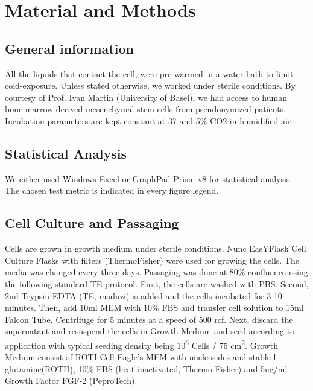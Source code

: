 \newcommand{\product}{\textit}

\chapter{Material and Methods}

\section{General information}
All the liquids that contact the cell, were pre-warmed in a water-bath to limit cold-exposure. Unless stated otherwise, we worked under sterile conditions. By courtesy of Prof. Ivan Martin (University of Basel), we had access to human bone-marrow derived mesenchymal stem cells from pseudonymized patients. Incubation parameters are kept constant at 37 \degC{} and 5\% CO2 in humidified air.

\section{Statistical Analysis}
We either used Windows Excel or GraphPad Prism v8 for statistical analysis. The chosen test metric is indicated in every figure legend.

\section{Cell Culture and Passaging}
Cells are grown in growth medium under sterile conditions. Nunc\texttrademark{} EasYFlask\texttrademark{} Cell Culture Flasks with filters (ThermoFisher) were used for growing the cells. The media was changed every three days. Passaging was done at 80\% confluence using the following standard TE-protocol. First, the cells are washed with PBS. Second, 2ml Trypsin-EDTA (TE, maduzi) is added and the cells incubated for 3-10 minutes. Then, add 10ml MEM\textalpha{} with 10\% FBS and transfer cell solution to 15ml Falcon Tube. Centrifuge for 5 minutes at a speed of 500 rcf. Next, discard the supernatant and resuspend the cells in Growth Medium and seed according to application with typical seeding density being 10\textsuperscript{6} Cells / 75 cm\textsuperscript{2}. 
Growth Medium consist of ROTI\textregistered{} Cell Eagle's MEM\textalpha{} with nucleosides and stable l-glutamine(ROTH), 10\% FBS (heat-inactivated, Thermo Fisher) and 5ng/ml Growth Factor FGF-2 (PeproTech).

